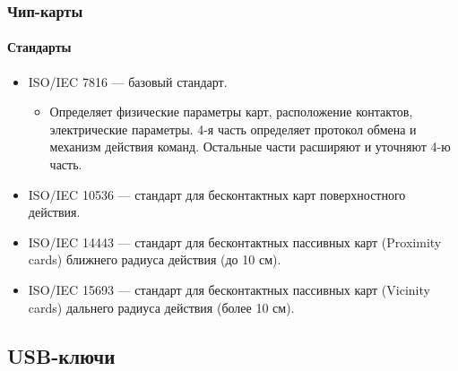 \begin{frame}
    \frametitle{Чип-карты}
    \framesubtitle{Стандарты}
    
    \begin{itemize}
        \item \alert{ISO/IEC 7816} --- базовый стандарт.
        \begin{itemize}
            \item Определяет физические параметры карт, 
            расположение контактов, электрические параметры. 4-я часть определяет протокол обмена 
            и механизм действия команд. Остальные части расширяют и уточняют 4-ю часть.
        \end{itemize}
        
        \item \alert{ISO/IEC 10536} --- стандарт для бесконтактных карт поверхностного действия.
        
        \item \alert{ISO/IEC 14443} --- стандарт для бесконтактных пассивных карт (Proximity cards) ближнего радиуса действия (до 10 см).
        
        \item \alert{ISO/IEC 15693} --- стандарт для бесконтактных пассивных карт (Vicinity cards) дальнего радиуса действия (более 10 см).
        
    \end{itemize}
\end{frame}



\subsection{USB-ключи}


